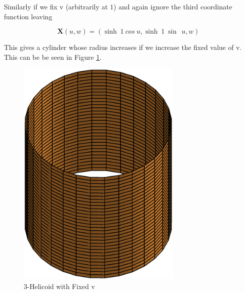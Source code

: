 Similarly if we fix v (arbitrarily at $1$) and again ignore the third coordinate function leaving

\begin{displaymath}
\mathbf X(u,w) = (\sinh \: 1\: cos \: u, \sinh \:1 \: \sin \:\ u, w)
\end{displaymath}

This gives a cylinder whose radius increases if we increase the fixed value of v. This can be be seen in Figure \ref{fig:3HelFixedv}.
\begin{figure}[htbp]
	\centering
       \includegraphics[width=8cm]{Images/3HelFixedv.eps}
   \caption{3-Helicoid with Fixed v}
   \label{fig:3HelFixedv}
\end{figure}

